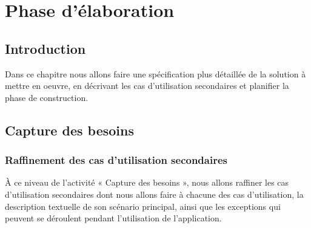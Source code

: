 \documentclass[12 pt ]{report}
\begin{document}
\chapter{Phase d’élaboration }
\section*{Introduction}  
Dans ce chapitre nous allons faire une spécification plus
détaillée de la solution à mettre en oeuvre, en décrivant les cas d'utilisation secondaires et planifier la phase de construction.
\section{Capture des besoins}
\subsection{Raffinement des cas d’utilisation secondaires}
À ce niveau de l’activité « Capture des besoins », nous allons raffiner les cas d'utilisation secondaires dont nous allons faire à chacune des cas d'utilisation, la description textuelle de son scénario principal, ainsi que les exceptions qui peuvent se déroulent pendant l'utilisation de l’application.
\newpage
\end{document}
